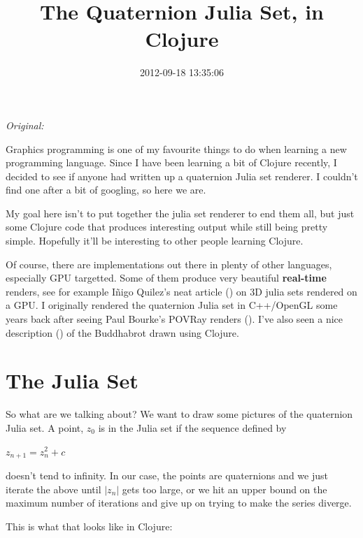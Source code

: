 \documentclass[11pt]{article}
\begin{document}
\title{The Quaternion Julia Set, in Clojure}
\date{2012-09-18 13:35:06}
\maketitle

\noindent\textit{Original: }\texttt{}\par
\medskip
Graphics programming is one of my favourite things to do when learning a new programming language. Since I have been learning a bit of Clojure recently, I decided to see if anyone had written up a quaternion Julia set renderer. I couldn't find one after a bit of googling, so here we are.

My goal here isn't to put together the julia set renderer to end them all, but just some Clojure code that produces interesting output while still being pretty simple. Hopefully it'll be interesting to other people learning Clojure.

Of course, there are implementations out there in plenty of other languages, especially GPU targetted. Some of them produce very beautiful \textbf{real-time} renders, see for example Iñigo Quilez's neat article (\texttt{}) on 3D julia sets rendered on a GPU. I originally rendered the quaternion Julia set in C++/OpenGL some years back after seeing Paul Bourke's POVRay renders (\texttt{}). I've also seen a nice description (\texttt{}) of the Buddhabrot drawn using Clojure.

\section{The Julia Set}

So what are we talking about? We want to draw some pictures of the quaternion Julia set.
A point, $z_0$ is in the Julia set if the sequence defined by

$z_{n + 1} = z_{n}^2 + c$

doesn't tend to infinity. In our case, the points are quaternions and we just iterate the above until $|z_n|$ gets too large, or we hit an upper bound on the maximum number of iterations and give up on trying to make the series diverge.

This is what that looks like in Clojure:
\end{document}
